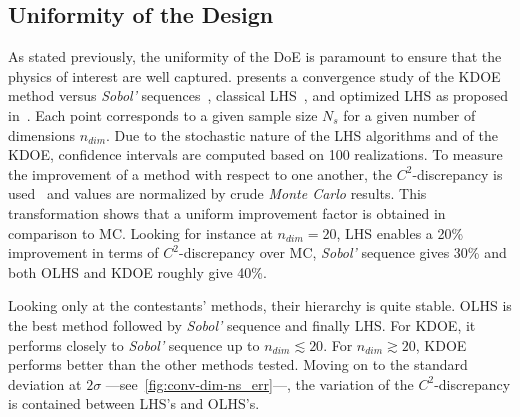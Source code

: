 \subsection{Uniformity of the Design}
As stated previously, the uniformity of the DoE is paramount to ensure that the physics of interest are well captured.  presents a convergence study of the KDOE method versus \emph{Sobol'} sequences~\citep{Sobol1967}, classical LHS~\citep{Mckay1979}, and optimized LHS as proposed in~\citep{Baudin2015a}. Each point corresponds to a given sample size $N_s$ for a given number of dimensions $n_{dim}$. Due to the stochastic nature of the LHS algorithms and of the KDOE, confidence intervals are computed based on 100 realizations. To measure the improvement of a method with respect to one another, the $C^2$-discrepancy is used~\citep{Fang2006,Androulakis2016} and values are normalized by crude \emph{Monte Carlo} results. This transformation shows that a uniform improvement factor is obtained in comparison to MC. Looking for instance at $n_{dim} = 20$, LHS enables a 20\% improvement in terms of $C^2$-discrepancy over MC, \emph{Sobol'} sequence gives 30\% and both OLHS and KDOE roughly give 40\%.

Looking only at the contestants' methods, their hierarchy is quite stable. OLHS is the best method followed by \emph{Sobol'} sequence and finally LHS. For KDOE, it performs closely to \emph{Sobol'} sequence up to $n_{dim} \lesssim 20$. For $n_{dim} \gtrsim 20$, KDOE performs better than the other methods tested. Moving on to the standard deviation at $2\sigma$ ---\thinspace see~\cref{fig:conv-dim-ns_err}\thinspace---, the variation of the $C^2$-discrepancy is contained between LHS’s and OLHS’s.


